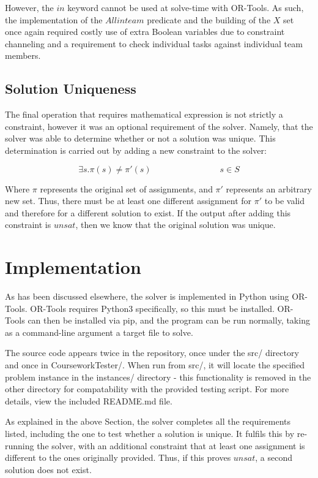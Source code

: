 \documentclass[11pt]{article}
\begin{document}
			However, the \(in\) keyword cannot be used at solve-time with OR-Tools.
			As such, the implementation of the \(Allinteam\) predicate and the building of the \(X\) set
			once again required costly use of extra Boolean variables due to constraint channeling and
			a requirement to check individual tasks against individual team members.

		\subsection{Solution Uniqueness}

			The final operation that requires mathematical expression is not strictly a constraint,
			however it was an optional requirement of the solver.
			Namely, that the solver was able to determine whether or not a solution was unique.
			This determination is carried out by adding a new constraint to the solver:

			\begin{equation}
				\exists s. \pi(s) \neq \pi'(s) \qquad \qquad \qquad \qquad s \in S
			\end{equation}

			Where \(\pi\) represents the original set of assignments, and \(\pi'\) represents an arbitrary new set.
			Thus, there must be at least one different assignment for \(\pi'\) to be valid and therefore
			for a different solution to exist. If the output after adding this constraint is \(unsat\),
			then we know that the original solution was unique.

	\section{Implementation}

		As has been discussed elsewhere, the solver is implemented in Python using OR-Tools.
		OR-Tools requires Python3 specifically, so this must be installed.
		OR-Tools can then be installed via pip, and the program can be run normally,
		taking as a command-line argument a target file to solve.

		The source code appears twice in the repository,
		once under the src/ directory and once in CourseworkTester/.
		When run from src/, it will locate the specified problem instance in the instances/ directory -
		this functionality is removed in the other directory for compatability with the provided testing script.
		For more details, view the included README.md file.

		As explained in the above Section, the solver completes all the requirements listed, including the one to test whether a solution is unique.
		It fulfils this by re-running the solver, with an additional constraint that at least one assignment is different to the ones originally provided.
		Thus, if this proves \(unsat\), a second solution does not exist.
\end{document}
